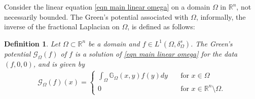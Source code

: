 \documentclass{amsart}
\newtheorem{definition}[theorem]{Definition}
\newcommand{\R}{\mathbb{R}}
\newcommand{\rn}{\mathbb{R}^{n}}
\newcommand{\g}[1]{\mathcal{G}_{#1}}
\newcommand{\gk}[1]{\mathbb{G}_{#1}}
\begin{document}
Consider the linear equation \eqref{eqn main linear omega} on a domain $\Omega$ in $\R^{n}$, not necessarily bounded. The Green's potential associated with $\Omega$, informally, the inverse of the fractional Laplacian on $\Omega$, is defined as follows:
 \begin{definition}\label{defining the operator G}
    Let $\Omega\subset \rn$ be a domain and $f\in L^{1}(\Omega,\delta_{\Omega}^{s})$. The Green's potential $\g{\Omega}(f)$ of $f$ is a solution of \eqref{eqn main linear omega} for the data $(f,0,0)$, and is given by
    \begin{align*}
        \g{\Omega}(f)(x)=
        \begin{cases}
             \displaystyle \int_{\Omega}\gk{\Omega}(x,y)f(y) dy & \quad \text{for } x\in\Omega \\
             0 &\quad \text{for }x\in \rn \setminus \Omega.
        \end{cases}           
    \end{align*}
\end{definition}
\end{document}
